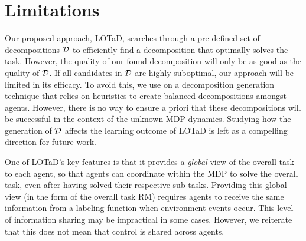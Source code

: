 \section{Limitations}\label{appendix:limitations}
Our proposed approach, LOTaD, searches through a pre-defined set of decompositions $\mathcal{D}$ to efficiently find a decomposition that optimally solves the task. However, the quality of our found decomposition will only be as good as the quality of $\mathcal{D}$. If all candidates in $\mathcal{D}$ are highly suboptimal, our approach will be limited in its efficacy. To avoid this, we use on a decomposition generation technique that relies on heuristics to create balanced decompositions amongst agents. However, there is no way to ensure a priori that these decompositions will be successful in the context of the unknown MDP dynamics. Studying how the generation of $\mathcal{D}$ affects the learning outcome of LOTaD is left as a compelling direction for future work.

One of LOTaD's key features is that it provides a \textit{global} view of the overall task to each agent, so that agents can coordinate within the MDP to solve the overall task, even after having solved their respective sub-tasks. Providing this global view (in the form of the overall task RM) requires agents to receive the same information from a labeling function when environment events occur. This level of information sharing may be impractical in some cases. However, we reiterate that this does not mean that control is shared across agents. 


